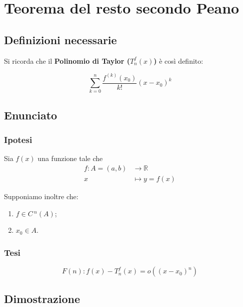 \documentclass[../dimostrazioni]{subfiles}
\begin{document}
    \chapter{Teorema del resto secondo Peano}
    \label{teoPeano}

        \section*{Definizioni necessarie}

            Si ricorda che il \textbf{Polinomio di Taylor (\(T _n ^ f (x) \))} è così definito:

            \[ \sum_{k = 0}^{n} \frac{f^{(k)} (x_0)}{k!}(x-x_0)^k\]

        \section*{Enunciato}

            \subsection*{Ipotesi}

                Sia \(f(x)\) una funzione tale che
                \begin{align*}
                    f : A = (a, b) &\longrightarrow \mathbb{R}\\
                    x &\longmapsto y = f(x) 
                \end{align*}

                Supponiamo inoltre che:

                \begin{enumerate}
                    \indentitem \item \(f \in C\,^n(A) \);
                    \indentitem \item \(x_0 \in A\).
                \end{enumerate}

            \subsection*{Tesi}

                \[ F(n): f(x) - T _n ^ f (x) = o ((x-x_0)^n) \]

        \section*{Dimostrazione}
\end{document}

